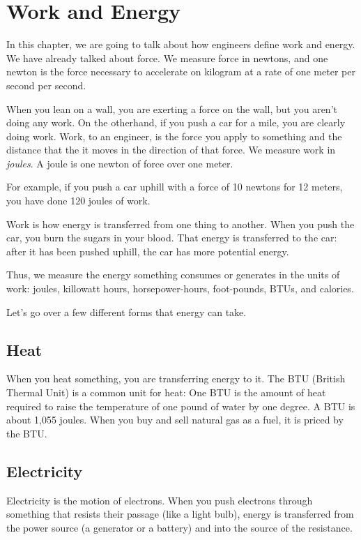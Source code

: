 \chapter{Work and Energy}

In this chapter, we are going to talk about how engineers define work
and energy.  We have already talked about force.  We measure force in
newtons, and one newton is the force necessary to accelerate on
kilogram at a rate of one meter per second per second.

When you lean on a wall, you are exerting a force on the wall, but you
aren't doing any work. On the otherhand, if you push a car for a mile,
you are clearly doing work. Work, to an engineer, is the force you
apply to something and the distance that the it moves in the direction
of that force. We measure work in \textit{joules}. A joule is one
newton of force over one meter.

For example, if you push a car uphill with a force of 10 newtons for 12
meters, you have done 120 joules of work.

Work is how energy is transferred from one thing to another. When you
push the car, you burn the sugars in your blood. That energy is
transferred to the car: after it has been pushed uphill, the car has
more potential energy.

Thus, we measure the energy something consumes or generates in the
units of work: joules, killowatt hours, horsepower-hours, foot-pounds,
BTUs, and calories.

Let's go over a few different forms that energy can take.

\section{Heat}

When you heat something, you are transferring energy to it.  The BTU
(British Thermal Unit) is a common unit for heat: One BTU is the
amount of heat required to raise the temperature of one pound of water
by one degree. A BTU is about 1,055 joules. When you buy and sell
natural gas as a fuel, it is priced by the BTU. 

\section{Electricity}

Electricity is the motion of electrons. When you push electrons
through something that resists their passage (like a light bulb),
energy is transferred from the power source (a generator or a battery)
and into the source of the resistance.

